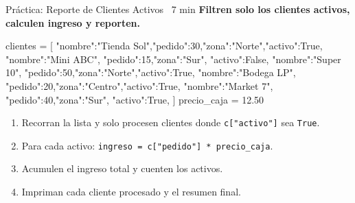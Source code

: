 \documentclass[aspectratio=169, 11pt]{beamer}
\begin{document}
\begin{frame}[fragile,shrink=30]{Práctica: Reporte de Clientes Activos \hfill
    {\normalsize\color{arcaRed}\faClock\ 7 min}}
  \vspace{-6pt}
  {\small\color{arcaDark}\bfseries
    Filtren solo los clientes activos, calculen ingreso y reporten.}

  \vspace{4pt}
  \begin{pyblock}
clientes = [
  {"nombre":"Tienda Sol","pedido":30,"zona":"Norte","activo":True},
  {"nombre":"Mini ABC",  "pedido":15,"zona":"Sur",  "activo":False},
  {"nombre":"Super 10",  "pedido":50,"zona":"Norte","activo":True},
  {"nombre":"Bodega LP", "pedido":20,"zona":"Centro","activo":True},
  {"nombre":"Market 7",  "pedido":40,"zona":"Sur",  "activo":True},
]
precio_caja = 12.50
  \end{pyblock}

  \vspace{3pt}
  {\footnotesize
  \begin{enumerate}\setlength{\itemsep}{3pt}
    \item Recorran la lista y solo procesen clientes donde
          \texttt{c["activo"]} sea \texttt{True}.
    \item Para cada activo: \texttt{ingreso = c["pedido"] * precio_caja}.
    \item Acumulen el ingreso total y cuenten los activos.
    \item Impriman cada cliente procesado y el resumen final.
  \end{enumerate}
  }
\end{frame}
\end{document}
